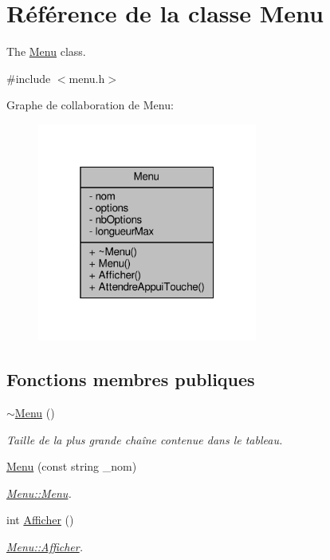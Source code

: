 \hypertarget{class_menu}{}\section{Référence de la classe Menu}
\label{class_menu}


The \hyperlink{class_menu}{Menu} class.  




{\ttfamily \#include $<$menu.\+h$>$}



Graphe de collaboration de Menu\+:\nopagebreak
\begin{figure}[H]
\begin{center}
\leavevmode
\includegraphics[width=205pt]{class_menu__coll__graph}
\end{center}
\end{figure}
\subsection*{Fonctions membres publiques}
\begin{DoxyCompactItemize}
\item 
\hyperlink{class_menu_a831387f51358cfb88cd018e1777bc980}{$\sim$\+Menu} ()
\begin{DoxyCompactList}\small\item\em Taille de la plus grande chaîne contenue dans le tableau. \end{DoxyCompactList}\item 
\hyperlink{class_menu_a3ec2bde9fc4dfdf5d4e8afcc562fd58f}{Menu} (const string \+\_\+nom)
\begin{DoxyCompactList}\small\item\em \hyperlink{class_menu_a3ec2bde9fc4dfdf5d4e8afcc562fd58f}{Menu\+::\+Menu}. \end{DoxyCompactList}\item 
int \hyperlink{class_menu_a079e0c6a24248a07993b48b310ba65ce}{Afficher} ()
\begin{DoxyCompactList}\small\item\em \hyperlink{class_menu_a079e0c6a24248a07993b48b310ba65ce}{Menu\+::\+Afficher}. \end{DoxyCompactList}\end{DoxyCompactItemize}
